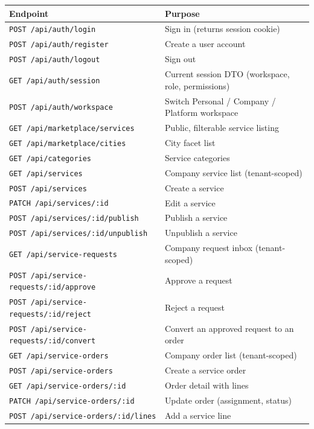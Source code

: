 \documentclass[11pt,a4paper]{article}
\begin{document}
\begin{longtable}{@{}L{6.4cm}L{8.2cm}@{}}
  \toprule
  \textbf{Endpoint} & \textbf{Purpose} \\
  \midrule
  \endhead
  \texttt{POST /api/auth/login} & Sign in (returns session cookie) \\
  \texttt{POST /api/auth/register} & Create a user account \\
  \texttt{POST /api/auth/logout} & Sign out \\
  \texttt{GET  /api/auth/session} & Current session DTO (workspace, role, permissions) \\
  \texttt{POST /api/auth/workspace} & Switch Personal / Company / Platform workspace \\
  \texttt{GET  /api/marketplace/services} & Public, filterable service listing \\
  \texttt{GET  /api/marketplace/cities} & City facet list \\
  \texttt{GET  /api/categories} & Service categories \\
  \texttt{GET  /api/services} & Company service list (tenant-scoped) \\
  \texttt{POST /api/services} & Create a service \\
  \texttt{PATCH /api/services/:id} & Edit a service \\
  \texttt{POST /api/services/:id/publish} & Publish a service \\
  \texttt{POST /api/services/:id/unpublish} & Unpublish a service \\
  \texttt{GET  /api/service-requests} & Company request inbox (tenant-scoped) \\
  \texttt{POST /api/service-requests/:id/approve} & Approve a request \\
  \texttt{POST /api/service-requests/:id/reject} & Reject a request \\
  \texttt{POST /api/service-requests/:id/convert} & Convert an approved request to an order \\
  \texttt{GET  /api/service-orders} & Company order list (tenant-scoped) \\
  \texttt{POST /api/service-orders} & Create a service order \\
  \texttt{GET  /api/service-orders/:id} & Order detail with lines \\
  \texttt{PATCH /api/service-orders/:id} & Update order (assignment, status) \\
  \texttt{POST /api/service-orders/:id/lines} & Add a service line \\

\end{longtable}
\end{document}
